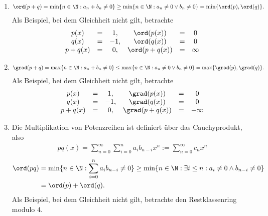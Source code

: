 \begin{solution}
\leavevmode \\
\begin{enumerate}
  \item \begin{align*}
    \ord(p + q) = \min\{n \in \N: a_n + b_n \neq 0\}
    \geq \min\{n \in \N: a_n \neq 0 \lor b_n \neq 0\}
    = \min\{\ord(p),\ord(q)\}.
  \end{align*}
  Als Beispiel, bei dem Gleichheit nicht gilt, betrachte
  \begin{align*}
  \begin{matrix}
    p(x) & = & 1, & \ord(p(x)) & = & 0 \\
    q(x) & = & -1, & \ord(q(x)) & = & 0 \\
    p + q (x) & = & 0, & \ord(p + q(x)) & = & \infty
  \end{matrix}
  \end{align*}
  \item \begin{align*}
    \grad(p + q) = \max\{n \in \N: a_n + b_n \neq 0 \}
    \leq \max\{n \in \N: a_n \neq 0 \lor b_n \neq 0 \}
    = \max\{\grad(p),\grad(q)\}.
    \end{align*}
    Als Beispiel, bei dem Gleichheit nicht gilt, betrachte
    \begin{align*}
    \begin{matrix}
      p(x) & = & 1, & \grad(p(x)) & = & 0 \\
      q(x) & = & -1, & \grad(q(x)) & = & 0 \\
      p + q (x) & = & 0, & \grad(p + q(x)) & = & -\infty
    \end{matrix}
    \end{align*}
  \item Die Multiplikation von Potenzreihen ist definiert über das Cauchyprodukt, also
  \begin{align*}
    pq(x) = \sum_{n=0}^{\infty}\sum_{i=0}^{n}a_ib_{n-i}x^n := \sum_{n=0}^{\infty}c_nx^n
  \end{align*}
  \begin{align*}
  \ord(pq) &= \min\{n \in \N: \sum_{i=0}^{n}a_ib_{n-i} \neq 0\}
  \geq \min\{n \in \N: \exists i \leq n: a_i \neq 0 \land b_{n-i} \neq 0\} \\
  &= \ord(p) + \ord(q).
  \end{align*}
  Als Beispiel, bei dem Gleichheit nicht gilt, betrachte den Restklassenring modulo $4$.
  \begin{align*}
  \begin{matrix}

\end{matrix}
\end{align*}
\end{enumerate}
\end{solution}
